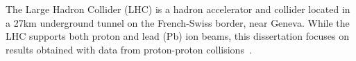 The Large Hadron Collider (LHC) is a hadron accelerator and collider located in a 27km underground tunnel on the French-Swiss border, near Geneva.
While the LHC supports both proton and lead (Pb) ion beams, this dissertation focuses on results obtained with data from proton-proton collisions~\cite{Evans_2008}.
